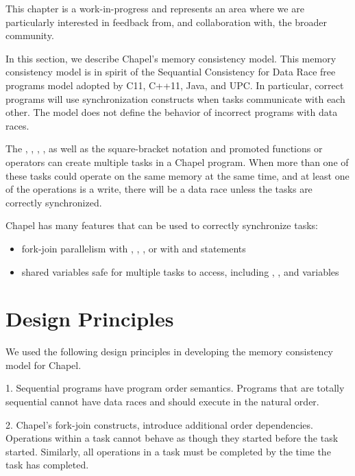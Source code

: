 \label{Memory_Consistency_Model}

\begin{openissue}
  This chapter is a work-in-progress and represents an area where we
  are particularly interested in feedback from, and collaboration
  with, the broader community.
\end{openissue}

In this section, we describe Chapel's memory consistency model. This memory
consistency model is in spirit of the Sequantial Consistency for Data Race free
programs model adopted by C11, C++11, Java, and UPC. In particular, correct
programs will use synchronization constructs when tasks communicate with each
other. The model does not define the behavior of incorrect programs with data
races.

The , , , , as well as
the square-bracket notation and promoted functions or operators can create
multiple tasks in a Chapel program. When more than one of these tasks could
operate on the same memory at the same time, and at least one of the operations
is a write, there will be a data race unless the tasks are correctly
synchronized.

Chapel has many features that can be used to correctly synchronize tasks:
\begin{itemize}
  \item fork-join parallelism with , , , or with  and  statements
  \item shared variables safe for multiple tasks to access, including , , and  variables
\end{itemize}

\section{Design Principles}

We used the following design principles in developing the memory consistency
model for Chapel.

1. Sequential programs have program order semantics. Programs that are totally sequential cannot have data races and should execute in the natural order.

2. Chapel's fork-join constructs, introduce additional order dependencies. Operations within a task cannot behave as though they started before the task started. Similarly, all operations in a task must be completed by the time the task has completed.

